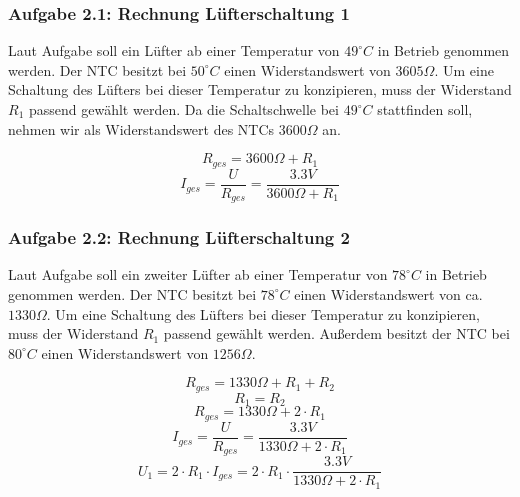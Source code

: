\newpage

\subsubsection{Aufgabe 2.1: Rechnung Lüfterschaltung 1}

Laut Aufgabe soll ein Lüfter ab einer Temperatur von $49^{\circ} C$ in Betrieb genommen werden. Der NTC besitzt bei $50^{\circ} C$ einen Widerstandswert von $3605 \Omega$. Um eine Schaltung des Lüfters bei dieser Temperatur zu konzipieren, muss der Widerstand $R_1$ passend gewählt werden. Da die Schaltschwelle bei $49^{\circ} C$ stattfinden soll, nehmen wir als Widerstandswert des NTCs $3600 \Omega$ an.

\[ R_{ges} = 3600 \Omega + R_1 \]
\[ I_{ges} = \frac{U}{R_{ges}} = \frac{3.3 V}{3600 \Omega + R_1} \]


\subsubsection{Aufgabe 2.2: Rechnung Lüfterschaltung 2}

Laut Aufgabe soll ein zweiter Lüfter ab einer Temperatur von $78^{\circ} C$ in Betrieb genommen werden. Der NTC besitzt bei $78^{\circ} C$ einen Widerstandswert von ca. $1330 \Omega$. Um eine Schaltung des Lüfters bei dieser Temperatur zu konzipieren, muss der Widerstand $R_1$ passend gewählt werden. Außerdem besitzt der NTC bei $80^{\circ} C$ einen Widerstandswert von $1256 \Omega$. \cite{ntc}

\[ R_{ges} = 1330 \Omega + R_1 + R_2\]
\[ R_1 = R_2 \]
\[ R_{ges} = 1330 \Omega + 2 \cdot R_1 \]
\[ I_{ges} = \frac{U}{R_{ges}} = \frac{3.3 V}{1330 \Omega + 2 \cdot R_1} \]
\[ U_{1} = 2 \cdot R_1 \cdot I_{ges} = 2 \cdot R_1 \cdot \frac{3.3 V}{1330 \Omega + 2 \cdot R_1} \]


